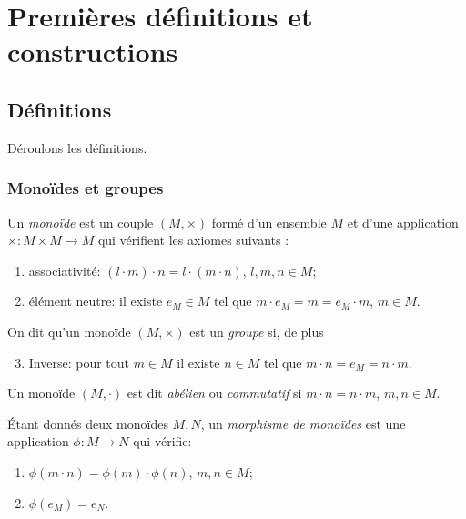 \chapter{Premières définitions et constructions}

\section{Définitions}

Déroulons les définitions.

\subsection{Monoïdes et groupes}

\begin{definition}
    Un \emph{monoïde} est un couple $(M,\times)$ formé d'un
    ensemble $M$ et d'une application $\times:M\times M\rightarrow M$ qui
    vérifient les axiomes suivants :
    \begin{enumerate}
      \item associativité: $(l\cdot m)\cdot n=l\cdot (m\cdot n)$, $l,m,n\in M$;
      \item élément neutre: il existe $e_M\in M$ tel que $m\cdot e_M=m=e_M\cdot
          m$, $m\in M$.
    \end{enumerate}

    On dit qu'un monoïde $(M,\times)$ est un \emph{groupe} si, de
    plus
    \begin{enumerate}
    \setcounter{enumi}{2}
        \item Inverse: pour tout $m\in M$ il existe $n\in M$ tel  que $m\cdot
        n=e_M=n\cdot m$.\\
    \end{enumerate}
\end{definition}

Un monoïde $(M,\cdot)$ est dit \emph{abélien} ou \emph{commutatif} si $m\cdot
n=n\cdot m$, $m,n\in M$.

\begin{definition}
    Étant donnés deux monoïdes $M,N$, un \emph{morphisme de monoïdes} est une
    application $\phi:M\rightarrow N$ qui vérifie:
    \begin{enumerate}
        \item $\phi(m\cdot n)=\phi(m)\cdot\phi(n)$, $m,n\in M$;
        \item $\phi(e_M )=e_N$.
    \end{enumerate}
\end{definition}

